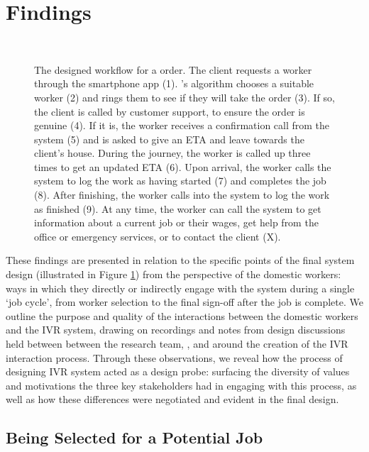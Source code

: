 \section{Findings}

\begin{figure}
  \centering
  
  \caption{The designed workflow for a \PC{} order. The client requests a worker through the smartphone app (1). \PC{}'s algorithm chooses a suitable worker (2) and rings them to see if they will take the order (3). If so, the client is called by customer support, to ensure the order is genuine (4). If it is, the worker receives a confirmation call from the system (5) and is asked to give an ETA and leave towards the client's house. During the journey, the worker is called up three times to get an updated ETA (6). Upon arrival, the worker calls the system to log the work as having started (7) and completes the job (8). After finishing, the worker calls into the system to log the work as finished (9). At any time, the worker can call the system to get information about a current job or their wages, get help from the \PC{} office or emergency services, or to contact the client (X). }~\label{fig:WorkFlow}
\end{figure}

These findings are presented in relation to the specific points of the final \PC{} system design (illustrated in Figure \ref{fig:WorkFlow}) from the perspective of the domestic workers: ways in which they directly or indirectly engage with the system during a single `job cycle', from worker selection to the final sign-off after the job is complete. We outline the purpose and quality of the interactions between the domestic workers and the IVR system, drawing on recordings and notes from design discussions held between between the research team, \PC{}, and \NGO{} around the creation of the IVR interaction process. Through these observations, we reveal how the process of designing IVR system acted as a design probe: surfacing the diversity of values and motivations the three key stakeholders had in engaging with this process, as well as how these differences were negotiated and evident in the final design. 

\subsection{Being Selected for a Potential Job}

